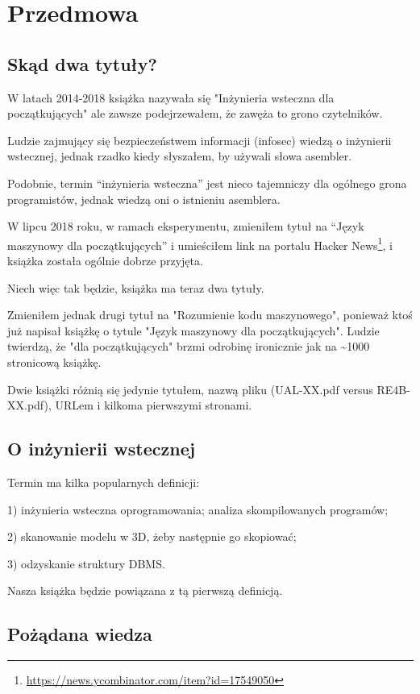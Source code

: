 \section*{Przedmowa}

\subsection*{Skąd dwa tytuły?}
\label{TwoTitles}

W latach 2014-2018 książka nazywała się "Inżynieria wsteczna dla początkujących" ale zawsze podejrzewałem, że zawęża to grono czytelników.

Ludzie zajmujący się bezpieczeństwem informacji (infosec) wiedzą o inżynierii wstecznej, jednak rzadko kiedy słyszałem, by używali słowa asembler.

Podobnie, termin ``inżynieria wsteczna'' jest nieco tajemniczy dla ogólnego grona programistów, jednak wiedzą oni o istnieniu asemblera.

W lipcu 2018 roku, w ramach eksperymentu, zmieniłem tytuł na ``Język maszynowy dla początkujących''
i umieściłem link na portalu Hacker News\footnote{\url{https://news.ycombinator.com/item?id=17549050}}, i książka została ogólnie dobrze przyjęta.

Niech więc tak będzie, książka ma teraz dwa tytuły.

Zmieniłem jednak drugi tytuł na "Rozumienie kodu maszynowego",
ponieważ ktoś już napisał książkę o tytule "Język maszynowy dla początkujących".
Ludzie twierdzą, że "dla początkujących" brzmi odrobinę ironicznie jak na \textasciitilde{}1000 stronicową książkę.

Dwie książki różnią się jedynie tytułem, nazwą pliku (UAL-XX.pdf versus RE4B-XX.pdf),
URLem i kilkoma pierwszymi stronami.

\subsection*{O inżynierii wstecznej}

Termin  ma kilka popularnych definicji:

1) inżynieria wsteczna oprogramowania; analiza skompilowanych programów; 

2) skanowanie modelu w 3D, żeby następnie go skopiować;

3) odzyskanie struktury \ac{DBMS}. 

Nasza książka będzie powiązana z tą pierwszą definicją.

\subsection*{Pożądana wiedza}

